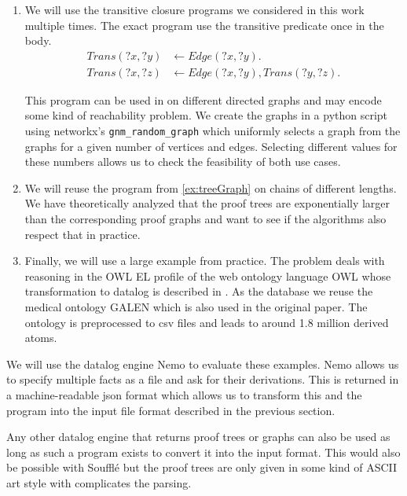 \begin{enumerate}
    \item We will use the transitive closure programs we considered in this work multiple times. The exact program use the transitive predicate once in the body.
    \begin{equation}
        \begin{split}
            Trans(?x, ?y) &\leftarrow Edge(?x, ?y). \\
            Trans(?x, ?z) &\leftarrow Edge(?x, ?y),  Trans(?y, ?z). 
        \end{split}
    \end{equation}

    This program can be used in on different directed graphs and may encode some kind of reachability problem. We create the graphs in a python script using networkx's \lstinline|gnm_random_graph| which uniformly selects a graph from the graphs for a given number of vertices and edges. Selecting different values for these numbers allows us to check the feasibility of both use cases.

    \item We will reuse the program from \cref{ex:treeGraph} on chains of different lengths. We have theoretically analyzed that the proof trees are exponentially larger than the corresponding proof graphs and want to see if the algorithms also respect that in practice.
    
    \item Finally, we will use a large example from practice. The problem deals with reasoning in the OWL EL profile of the web ontology language OWL whose transformation to datalog is described in \cite{ELK}. As the database we reuse the medical ontology GALEN which is also used in the original paper. The ontology is preprocessed to csv files and leads to around 1.8 million derived atoms.
\end{enumerate}

We will use the datalog engine Nemo\cite{Nemo} to evaluate these examples. Nemo allows us to specify multiple facts as a file and ask for their derivations. This is returned in a machine-readable json format which allows us to transform this and the program into the input file format described in the previous section.

Any other datalog engine that returns proof trees or graphs can also be used as long as such a program exists to convert it into the input format. This would also be possible with Soufflé\cite{Souffle} but the proof trees are only given in some kind of ASCII art style with complicates the parsing.

